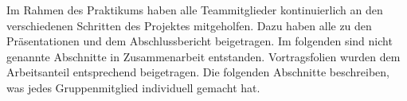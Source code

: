 Im Rahmen des Praktikums haben alle Teammitglieder kontinuierlich an den verschiedenen Schritten des Projektes mitgeholfen. Dazu haben alle zu den Präsentationen und dem Abschlussbericht beigetragen. Im folgenden sind nicht genannte Abschnitte in Zusammenarbeit entstanden. Vortragsfolien wurden dem Arbeitsanteil entsprechend beigetragen. Die folgenden Abschnitte beschreiben, was jedes Gruppenmitglied individuell gemacht hat.